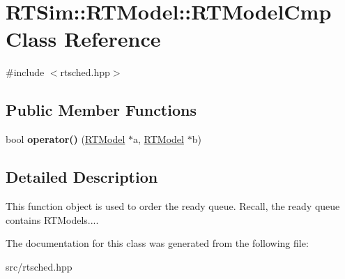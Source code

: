 \hypertarget{classRTSim_1_1RTModel_1_1RTModelCmp}{}\section{R\+T\+Sim\+:\+:R\+T\+Model\+:\+:R\+T\+Model\+Cmp Class Reference}
\label{classRTSim_1_1RTModel_1_1RTModelCmp}


{\ttfamily \#include $<$rtsched.\+hpp$>$}

\subsection*{Public Member Functions}
\begin{DoxyCompactItemize}
\item 
bool {\bfseries operator()} (\hyperlink{classRTSim_1_1RTModel}{R\+T\+Model} $\ast$a, \hyperlink{classRTSim_1_1RTModel}{R\+T\+Model} $\ast$b)\hypertarget{classRTSim_1_1RTModel_1_1RTModelCmp_a08cc2abd9c1b8ec9c118c1d83b649474}{}\label{classRTSim_1_1RTModel_1_1RTModelCmp_a08cc2abd9c1b8ec9c118c1d83b649474}

\end{DoxyCompactItemize}


\subsection{Detailed Description}
This function object is used to order the ready queue. Recall, the ready queue contains R\+T\+Models.... 

The documentation for this class was generated from the following file\+:\begin{DoxyCompactItemize}
\item 
src/rtsched.\+hpp\end{DoxyCompactItemize}
